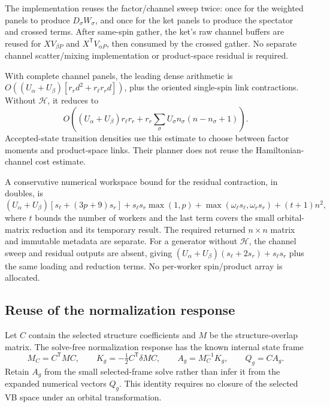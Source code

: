 \documentclass[11pt,a4paper]{article}
\newcommand{\Tr}{^{\mathsf T}}
\newcommand{\Ha}{\mathcal H}
\begin{document}
The implementation reuses the factor/channel sweep twice: once for the
weighted panels to produce $D_\sigma W_\sigma$, and once for the ket
panels to produce the spectator and crossed terms. After same-spin gather,
the ket's raw channel buffers are reused for $X V_{\beta P}$ and
$X\Tr V_{\alpha P}$, then consumed by the crossed gather. No separate
channel scatter/mixing implementation or product-space residual is required.

With complete channel panels, the leading dense arithmetic is
$O((U_\alpha+U_\beta)[r_r d^2+r_\ell r_r d])$, plus the oriented
single-spin link contractions. Without $\Ha$, it reduces to
\begin{equation}
 O\left((U_\alpha+U_\beta)r_\ell r_r
  +r_r\sum_{\sigma}U_\sigma n_\sigma(n-n_\sigma+1)\right).
\end{equation}
Accepted-state transition densities use this estimate to choose between
factor moments and product-space links. Their planner does not reuse the
Hamiltonian-channel cost estimate.

A conservative numerical workspace bound for the residual contraction,
in doubles, is
\begin{equation}
 (U_\alpha+U_\beta)[s_\ell+(3p+9)s_r]
 +s_\ell s_r\max(1,p)
 +\max(\omega_\ell s_\ell,\omega_r s_r)+(t+1)n^2,
\end{equation}
where $t$ bounds the number of workers and the last term covers the small
orbital-matrix reduction and its temporary result. The required returned
$n\times n$ matrix and immutable metadata are separate. For a generator
without $\Ha$, the channel sweep and residual outputs are absent, giving
$(U_\alpha+U_\beta)(s_\ell+2s_r)+s_\ell s_r$ plus the same loading
and reduction terms. No per-worker spin/product array is allocated.

\subsection{Reuse of the normalization response}

Let $C$ contain the selected structure coefficients and $M$ be the
structure-overlap matrix. The solve-free normalization response has the
known internal state frame
\begin{equation}
 M_C=C\Tr MC,\qquad K_g=-\tfrac12 C\Tr\delta M C,\qquad
 A_g=M_C^{-1}K_g,\qquad Q_g=C A_g.
 \label{eq:gauge-frame}
\end{equation}
Retain $A_g$ from the small selected-frame solve rather than infer it from
the expanded numerical vectors $Q_g$. This identity requires no closure of
the selected VB space under an orbital transformation.
\end{document}

